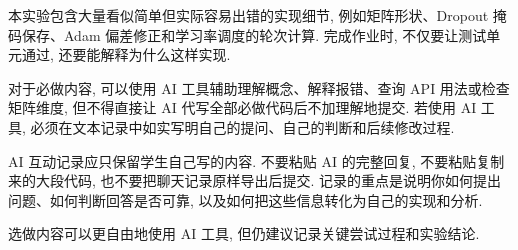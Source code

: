 \documentclass{../../nndlcourse}
\begin{document}
本实验包含大量看似简单但实际容易出错的实现细节, 例如矩阵形状、Dropout 掩码保存、Adam 偏差修正和学习率调度的轮次计算. 完成作业时, 不仅要让测试单元通过, 还要能解释为什么这样实现.

对于必做内容, 可以使用 AI 工具辅助理解概念、解释报错、查询 API 用法或检查矩阵维度, 但不得直接让 AI 代写全部必做代码后不加理解地提交. 若使用 AI 工具, 必须在文本记录中如实写明自己的提问、自己的判断和后续修改过程.

AI 互动记录应只保留学生自己写的内容. 不要粘贴 AI 的完整回复, 不要粘贴复制来的大段代码, 也不要把聊天记录原样导出后提交. 记录的重点是说明你如何提出问题、如何判断回答是否可靠, 以及如何把这些信息转化为自己的实现和分析.

选做内容可以更自由地使用 AI 工具, 但仍建议记录关键尝试过程和实验结论.
\end{document}
